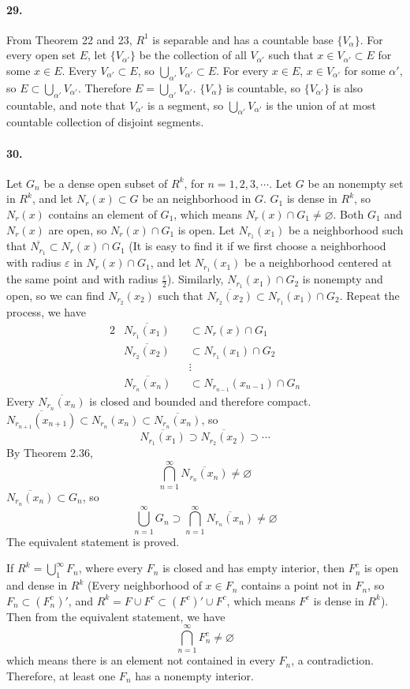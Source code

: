 \documentclass[a4paper]{article}
\begin{document}
\paragraph{29.}
From Theorem 22 and 23, $R^1$ is separable and has a countable base $\{V_\alpha\}$. For every open set $E$, let $\{V_{\alpha'}\}$ be the collection of all $V_{\alpha'}$ such that $x\in V_{\alpha'}\subset E$ for some $x\in E$. Every $V_{\alpha'}\subset E$, so $\bigcup_{\alpha'}V_{\alpha'}\subset E$. For every $x\in E$, $x\in V_{\alpha'}$ for some $\alpha'$, so $E\subset\bigcup_{\alpha'}V_{\alpha'}$. Therefore $E=\bigcup_{\alpha'}V_{\alpha'}$. $\{V_{\alpha}\}$ is countable, so  $\{V_{\alpha'}\}$ is also countable, and note that $V_{\alpha'}$ is a segment, so $\bigcup_{\alpha'}V_{\alpha'}$ is the union of at most countable collection of disjoint segments.

\paragraph{30.}
Let $G_n$ be a dense open subset of $R^k$, for $n=1,2,3,\cdots$.
Let $G$ be an nonempty set in $R^k$, and let $N_r(x)\subset G$ be an neighborhood in $G$. $G_1$ is dense in $R^k$, so $N_r(x)$ contains an element of $G_1$, which means $N_r(x)\cap G_1\neq\varnothing$. Both $G_1$ and $N_r(x)$ are open, so $N_r(x)\cap G_1$ is open. Let $N_{r_1}(x_1)$ be a neighborhood such that $\overline{N_{r_1}}\subset N_r(x)\cap G_1$ (It is easy to find it if we first choose a neighborhood with radius $\varepsilon$ in $N_r(x)\cap G_1$, and let $N_{r_1}(x_1)$ be a neighborhood centered at the same point and with radius $\frac{\varepsilon}{2}$). Similarly, $N_{r_1}(x_1)\cap G_2$ is nonempty and open, so we can find $N_{r_2}(x_2)$ such that $\overline{N_{r_2}(x_2)}\subset N_{r_1}(x_1)\cap G_2$. Repeat the process, we have
\begin{alignat*}{2}
    & \overline{N_{r_1}(x_1)} && \subset N_r(x)\cap G_1\\
    & \overline{N_{r_2}(x_2)} && \subset N_{r_1}(x_1)\cap G_2\\
    & && \vdots \\
    & \overline{N_{r_n}(x_n)} && \subset N_{r_{n-1}}(x_{n-1})\cap G_n
\end{alignat*}
Every $\overline{N_{r_n}(x_n)}$ is closed and bounded and therefore compact. $\overline{N_{r_{n+1}}(x_{n+1})}\subset N_{r_n}(x_n) \subset\overline{N_{r_n}(x_n)}$, so
\[
\overline{N_{r_1}(x_1)}\supset \overline{N_{r_2}(x_2)}\supset\cdots
\]
By Theorem 2.36, 
\[
\bigcap_{n=1}^\infty\overline{N_{r_n}(x_n)}\neq\varnothing
\]
$\overline{N_{r_n}(x_n)}\subset G_n$, so
\[
\bigcup_{n=1}^\infty G_n\supset\bigcap_{n=1}^\infty\overline{N_{r_n}(x_n)}\neq\varnothing
\]
The equivalent statement is proved.
\medskip

If $R^k=\bigcup_1^\infty F_n$, where every $F_n$ is closed and has empty interior, then $F_n^c$ is open and dense in $R^k$ (Every neighborhood of $x\in F_n$ contains a point not in $F_n$, so $F_n\subset(F_n^c)'$, and $R^k=F\cup F^c\subset(F^c)'\cup F^c$, which means $F^c$ is dense in $R^k$). Then from the equivalent statement, we have 
\[
\bigcap_{n=1}^\infty F_n^c\neq\varnothing
\]
which means there is an element not contained in every $F_n$, a contradiction. Therefore, at least one $F_n$ has a nonempty interior.
\end{document}
